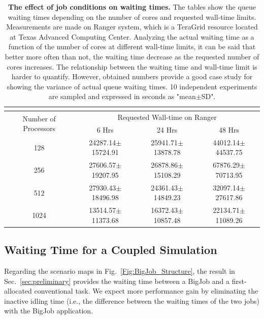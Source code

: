 \documentclass[preprint,12pt]{elsarticle}
\begin{document}
\begin{table}
  \caption{\small {\bf The effect of job conditions on waiting times.} The tables show the queue waiting times depending on the number of cores and requested wall-time limits. Measurements are made on Ranger system, which is a TeraGrid resource located at Texas Advanced Computing Center. Analyzing the actual waiting time as a function of the number of cores at different wall-time limits, it can be said that better more often than not, the waiting time decrease as the requested number of cores increases. The relationship between the waiting time and wall-time limit is harder to quantify. However, obtained numbers provide a good case study for showing the variance of actual queue waiting times. 
10 independent experiments are sampled and expressed in seconds as "mean$\pm$SD".}
  \label{table:WaitTime}
  \centering\footnotesize
  \begin{tabular}{c || c c c}
 \multicolumn{4}{c}{\phantom{\tiny 100}}\\
\hline
 \multirow{2}{0.15\textwidth}{Number of Processors} &
 \multicolumn{3}{c}{Requested Wall-time on Ranger} \\
\cline{2-4}
& 6 Hrs & 24 Hrs & 48 Hrs\\
\hline			
128  &  24287.14\scriptsize{$\pm$15724.91}  &  25941.71\scriptsize{$\pm$13878.78}  &  44012.14\scriptsize{$\pm$44537.75} \\
256  &  27606.57\scriptsize{$\pm$19207.95}  &  26878.86\scriptsize{$\pm$15108.29}  &  67876.29\scriptsize{$\pm$70713.95} \\
512  &  27930.43\scriptsize{$\pm$18496.98}  &  24361.43\scriptsize{$\pm$14849.23}  &  32097.14\scriptsize{$\pm$27617.86} \\
1024  &  13514.57\scriptsize{$\pm$11373.68}  &  16372.43\scriptsize{$\pm$10857.48}  &  22134.71\scriptsize{$\pm$11089.26} \\
\hline
\end{tabular}
\vspace{-1em}
\end{table}



\subsection{Waiting Time for a Coupled Simulation}
\label{sec:performance_waiting}

Regarding the scenario maps in Fig.~\ref{Fig:BigJob_Structure}, the result in Sec.~\ref{sec:preliminary} provides the waiting time between a BigJob and a first-allocated conventional task. We expect more performance gain by eliminating the inactive idling time (i.e., the difference between the waiting times of the two jobs) with the BigJob application. 
\end{document}
